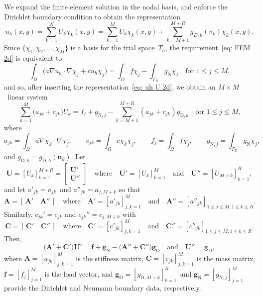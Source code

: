 We expand the finite element solution in the nodal basis, and enforce the 
Dirichlet boundary condition to obtain the representation
\begin{equation}\label{eq: uh U 2d}
u_h(x,y)=\sum_{k=1}^NU_k\chi_k(x,y)=\sum_{k=1}^MU_k\chi_k(x,y)
    +\sum_{k=M+1}^{M+R}g_{D,h}(\mathsf{n}_k)\chi_k(x,y).
\end{equation}
Since $\{\chi_1,\chi_2,\ldots,\chi_M\}$ is a basis for the trial space~$T_h$, 
the requirement~\eqref{eq: FEM 2d} is equivalent to
\begin{equation}\label{eq: FEM 2d alt}
\int_\Omega\bigl(a\nabla u_h\cdot\nabla\chi_j+cu_h\chi_j\bigr)
    =\int_\Omega f\chi_j
    -\int_{\Gamma_{\mathrm{N}}}g_{\mathrm{N}}\chi_j
    \quad\text{for $1\le j\le M$,}
\end{equation}
and so, after inserting the representation~\eqref{eq: uh U 2d}, we obtain an 
$M\times M$~linear system
\[
\sum_{k=1}^M\bigl(a_{jk}+c_{jk}\bigr)U_k
    =f_j+g_{\mathrm{N},j}-\sum_{k=M+1}^{M+R}(a_{jk}+c_{jk})g_{\mathrm{D},k}
    \quad\text{for $1\le j\le M$,}
\]
where
\[
a_{jk}=\int_\Omega a\nabla\chi_k\cdot\nabla\chi_j,\qquad
c_{jk}=\int_\Omega c\chi_k\chi_j,\qquad
f_j=\int_\Omega f\chi_j,\qquad
g_{\mathrm{N},j}=\int_{\Gamma_{\mathrm{N}}}g_{\mathrm{N}}\chi_j,
\]
and $g_{\mathrm{D},k}=g_{\mathrm{D},h}(\boldsymbol{n}_k)$. Let 
\[
\boldsymbol{U}=[U_k]_{k=1}^{M+R}
    =\begin{bmatrix}\boldsymbol{U}'\\ \boldsymbol{U}'' \end{bmatrix}
\quad\text{where}\quad
\boldsymbol{U}'=[U_k]_{k=1}^M
\quad\text{and}\quad
\boldsymbol{U}''=[U_{M+k}]_{k=1}^R,
\]
and let $a'_{jk}=a_{jk}$~and $a''_{jk}=a_{j,M+k}$ so that
\[
\boldsymbol{A}=[\,\boldsymbol{A}'\quad\boldsymbol{A}''\,]
\quad\text{where}\quad
\boldsymbol{A}'=[a'_{jk}]_{j,k=1}^M
\quad\text{and}\quad
\boldsymbol{A}''=[a''_{jk}]_{1\le j\le M,1\le k\le R}.
\]
Similarly, $c_{jk}'=c_{jk}$ and $c_{jk}''=c_{j,M+k}$ with
\[
\boldsymbol{C}=[\,\boldsymbol{C}'\quad\boldsymbol{C}''\,]
\quad\text{where}\quad
\boldsymbol{C}'=[c'_{jk}]_{j,k=1}^M
\quad\text{and}\quad
\boldsymbol{C}''=[c''_{jk}]_{1\le j\le M,1\le k\le R}.
\]
Then, 
\[
\bigl(\boldsymbol{A}'+\boldsymbol{C}'\bigr)\boldsymbol{U}'
    =\boldsymbol{f}+\boldsymbol{g}_{\mathrm{N}}
    -\bigl(\boldsymbol{A}''+\boldsymbol{C}''\bigr)\boldsymbol{g}_{\mathrm{D}}
\quad\text{and}\quad
\boldsymbol{U}''=\boldsymbol{g}_{\mathrm{D}},
\]
where $\boldsymbol{A}=[a_{jk}]_{j,k=1}^M$ is the stiffness matrix, 
$\boldsymbol{C}=[c_{jk}]_{j,k=1}^M$ is the mass matrix, 
$\boldsymbol{f}=[f_j]_{j=1}^M$ is the load vector, and
$\boldsymbol{g}_{\mathrm{D}}=[g_{\mathrm{D},M+k}]_{k=1}^R$~and
$\boldsymbol{g}_{\mathrm{N}}=[g_{\mathrm{N},j}]_{j=1}^M$ provide the Dirichlet 
and Neumann boundary data, respectively.

